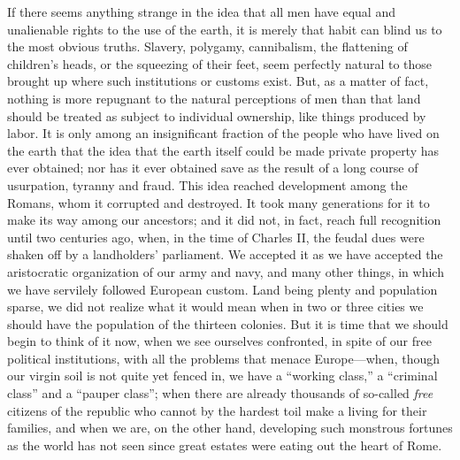 \documentclass{book}
\begin{document}
If there seems anything strange in the idea that all men have equal and unalienable rights to the use of the earth, it is merely that habit can blind us to the most obvious truths. Slavery, polygamy, cannibalism, the flattening of children’s heads, or the squeezing of their feet, seem perfectly natural to those brought up where such institutions or customs exist. But, as a matter of fact, nothing is more repugnant to the natural perceptions of men than that land should be treated as subject to individual ownership, like things produced by labor. It is only among an insignificant fraction of the people who have lived on the earth that the idea that the earth itself could be made private property has ever obtained; nor has it ever obtained save as the result of a long course of usurpation, tyranny and fraud. This idea reached development among the Romans, whom it corrupted and destroyed. It took many generations for it to make its way among our ancestors; and it did not, in fact, reach full recognition until two centuries ago, when, in the time of Charles II, the feudal dues were shaken off by a landholders’ parliament. We accepted it as we have accepted the aristocratic organization of our army and navy, and many other things, in which we have servilely followed European custom. Land being plenty and population sparse, we did not realize what it would mean when in two or three cities we should have the population of the thirteen colonies. But it is time that we should begin to think of it now, when we see ourselves confronted, in spite of our free political institutions, with all the problems that menace Europe—when, though our virgin soil is not quite yet fenced in, we have a “working class,” a “criminal class” and a “pauper class”; when there are already thousands of so-called \emph{free} citizens of the republic who cannot by the hardest toil make a living for their families, and when we are, on the other hand, developing such monstrous fortunes as the world has not seen since great estates were eating out the heart of Rome.
\end{document}
